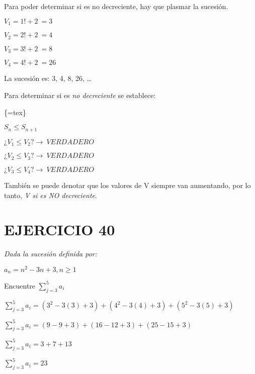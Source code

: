 \documentclass[
  letterpaper,
  DIV=11,
  numbers=noendperiod]{scrartcl}
\begin{document}
Para poder determinar si es no decreciente, hay que plasmar la sucesión.

\(V_{1} = 1! + 2 \ = 3\)

\(V_{2} = 2! + 2 \ = 4\)

\(V_{3} = 3! + 2 \ = 8\)

\(V_{4} = 4! + 2 \ = 26\)

La sucesión es: 3, 4, 8, 26, \ldots{}

Para determinar si es \emph{no decreciente} se establece:

\{=tex\}

\begin{center}
$S_{n} \leq S_{n+1}$
\end{center}

\(¿V_{1} \leq V_{2}? \rightarrow \ VERDADERO\)

\(¿V_{2} \leq V_{3}? \rightarrow \ VERDADERO\)

\(¿V_{3} \leq V_{4}? \rightarrow \ VERDADERO\)

También se puede denotar que los valores de V siempre van aumentando,
por lo tanto, \emph{V si es NO decreciente}.

\hypertarget{ejercicio-40}{%
\section{EJERCICIO 40}\label{ejercicio-40}}

\emph{Dada la sucesión definida por:}

\(a_{n} = n^{2} - 3n + 3 , n \geq 1\)

Encuentre \(\displaystyle\sum_{j=3}^{5} a_i\)

\(\displaystyle\sum_{j=3}^{5} a_i = (3^{2}-3(3)+3) +(4^{2}-3(4)+3) + (5^{2}-3(5)+3)\)

\(\displaystyle\sum_{j=3}^{5} a_i = (9-9+3) + (16-12+3)+(25-15+3)\)

\(\displaystyle\sum_{j=3}^{5} a_i = 3 + 7 + 13\)

\(\displaystyle\sum_{j=3}^{5} a_i = 23\)
\end{document}
